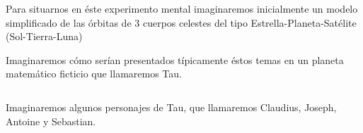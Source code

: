 \documentclass[preview]{standalone}
\begin{document}
\begin{center}
Para situarnos en éste experimento mental imaginaremos inicialmente un modelo simplificado de las órbitas de 3 cuerpos celestes del tipo Estrella-Planeta-Satélite (Sol-Tierra-Luna) 

$$ $$
Imaginaremos cómo serían presentados típicamente éstos temas en un planeta matemático ficticio que llamaremos Tau. 

$$ $$ 

Imaginaremos algunos personajes  de Tau, que llamaremos Claudius, Joseph, Antoine y Sebastian.
\end{center}
\end{document}
